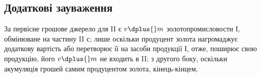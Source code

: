 \subsection{Додаткові зауваження}

За первісне грошове джерело для II є $v \dplus{} m$ золотопромисловости І,
обмінюване на частину II $с$; лише оскільки продуцент золота нагромаджує
додаткову вартість або перетворює її на засоби продукції І, отже,
поширює свою продукцію, його $v \dplus{} m$ не входить в II; з другого боку,
оскільки акумуляція грошей самим продуцентом золота, кінець-кінцем,
\parbreak{}  %
